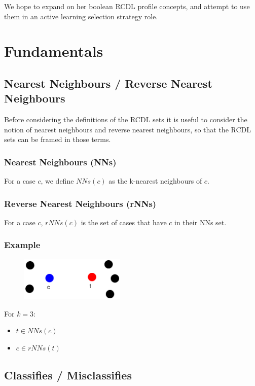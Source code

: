 \documentclass[a4paper,11pt]{report}
\begin{document}
We hope to expand on her boolean RCDL profile concepts, and attempt to use them in an active learning selection strategy role.

\section{Fundamentals}
\subsection{Nearest Neighbours / Reverse Nearest Neighbours}
Before considering the definitions of the RCDL sets it is useful to consider the notion of nearest neighbours and reverse nearest neighbours, so that the RCDL sets can be framed in those terms.

\subsubsection{Nearest Neighbours (NNs)}
For a case $c$, we define $NNs(c)$ as the k-nearest neighbours of $c$.

\subsubsection{Reverse Nearest Neighbours (rNNs)}
For a case $c$, $rNNs(c)$ is the set of cases that have $c$ in their NNs set.
\vspace{1em}
\begin{samepage}
\subsubsection{Example}
\begin{figure}[h!] \centering
\includegraphics[width=5cm]{./Drawn/RcdlNnRnnEg}
\end{figure}
For $k=3$:
\begin{itemize}
	\item $ t \in NNs(c) $
	\item $ c \in rNNs(t) $
\end{itemize}
\end{samepage}

\subsection{Classifies / Misclassifies}
\end{document}
